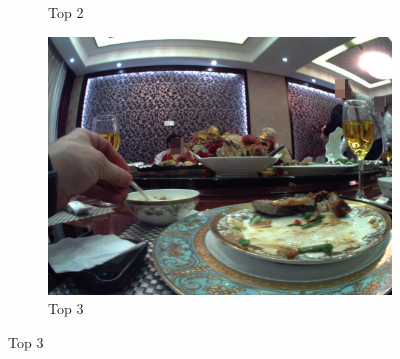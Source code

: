 \begin{figure}[H]
\begin{subfigure}{0.32\textwidth}
          \caption{Top 2}
        \end{subfigure}
          \begin{subfigure}{0.32\textwidth}
          \includegraphics[width=\textwidth]{Sections/7Results/images/run2top3.jpg}\hfill
            \caption{Top 3}
        \end{subfigure} \par\medskip



\end{figure}
